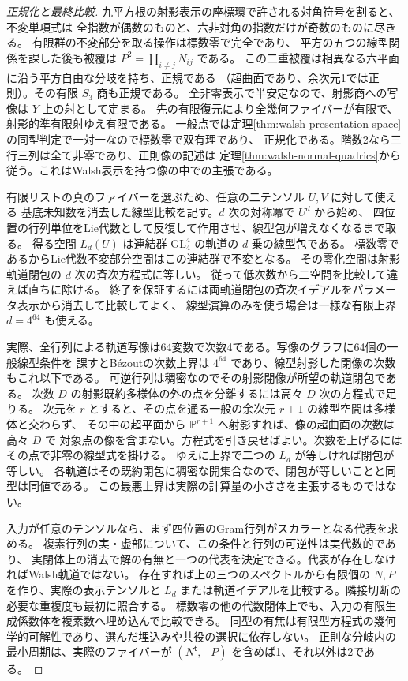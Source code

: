 \begin{proof}[正規化と最終比較]
九平方根の射影表示の座標環で許される対角符号を割ると、不変単項式は
全指数が偶数のものと、六非対角の指数だけが奇数のものに尽きる。
有限群の不変部分を取る操作は標数零で完全であり、
平方の五つの線型関係を課した後も被覆は $P^2=\prod_{i\ne j}N_{ij}$ である。
この二重被覆は相異なる六平面に沿う平方自由な分岐を持ち、正規である
（超曲面であり、余次元1では正則）。その有限 $S_3$ 商も正規である。
全非零表示で半安定なので、射影商への写像は $Y$ 上の射として定まる。
先の有限復元により全幾何ファイバーが有限で、射影的準有限射ゆえ有限である。
一般点では定理\ref{thm:walsh-presentation-space}の同型判定で一対一なので標数零で双有理であり、
正規化である。階数2なら三行三列は全て非零であり、正則像の記述は
定理\ref{thm:walsh-normal-quadrics}から従う。これはWalsh表示を持つ像の中での主張である。

有限リストの真のファイバーを選ぶため、任意の二テンソル $U,V$ に対して使える
基底未知数を消去した線型比較を記す。$d$ 次の対称冪で $U^d$ から始め、
四位置の行列単位をLie代数として反復して作用させ、線型包が増えなくなるまで取る。
得る空間 $L_d(U)$ は連結群 $\mathrm{GL}_4^4$ の軌道の $d$ 乗の線型包である。
標数零であるからLie代数不変部分空間はこの連結群で不変となる。
その零化空間は射影軌道閉包の $d$ 次の斉次方程式に等しい。
従って低次数から二空間を比較して違えば直ちに除ける。
終了を保証するには両軌道閉包の斉次イデアルをパラメータ表示から消去して比較してよく、
線型演算のみを使う場合は一様な有限上界 $d=4^{64}$ も使える。

実際、全行列による軌道写像は64変数で次数4である。写像のグラフに64個の一般線型条件を
課すとBézoutの次数上界は $4^{64}$ であり、線型射影した閉像の次数もこれ以下である。
可逆行列は稠密なのでその射影閉像が所望の軌道閉包である。
次数 $D$ の射影既約多様体の外の点を分離するには高々 $D$ 次の方程式で足りる。
次元を $r$ とすると、その点を通る一般の余次元 $r+1$ の線型空間は多様体と交わらず、
その中の超平面から $\mathbb P^{r+1}$ へ射影すれば、像の超曲面の次数は高々 $D$ で
対象点の像を含まない。方程式を引き戻せばよい。次数を上げるにはその点で非零の線型式を掛ける。
ゆえに上界で二つの $L_d$ が等しければ閉包が等しい。
各軌道はその既約閉包に稠密な開集合なので、閉包が等しいことと同型は同値である。
この最悪上界は実際の計算量の小ささを主張するものではない。

入力が任意のテンソルなら、まず四位置のGram行列がスカラーとなる代表を求める。
複素行列の実・虚部について、この条件と行列の可逆性は実代数的であり、
実閉体上の消去で解の有無と一つの代表を決定できる。代表が存在しなければWalsh軌道ではない。
存在すれば上の三つのスペクトルから有限個の $N,P$ を作り、実際の表示テンソルと
$L_d$ または軌道イデアルを比較する。隣接切断の必要な重複度も最初に照合する。
標数零の他の代数閉体上でも、入力の有限生成係数体を複素数へ埋め込んで比較できる。
同型の有無は有限型方程式の幾何学的可解性であり、選んだ埋込みや共役の選択に依存しない。
正則な分岐内の最小周期は、実際のファイバーが
$(N^{\mathsf t},-P)$ を含めば1、それ以外は2である。
\end{proof}
